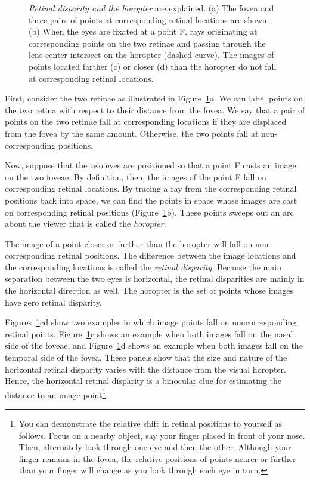 \begin{figure}
\centerline {
}
\caption[Retinal Disparity]{
{\em Retinal disparity and the horopter} are explained.
(a) The fovea and three pairs of points 
at corresponding retinal locations are shown.
(b) When the eyes are fixated at a point F,
rays originating at corresponding points on the two retinae
and passing through the lens center
intersect on the horopter (dashed curve).
The images of points located farther (c) or
closer (d) than the horopter do not fall at corresponding
retinal locations.
}
\label{f5:disparities}
\end{figure}
First, consider the two retinae as illustrated in
Figure~\ref{f5:disparities}a.
We can label points on the two retina with respect to their
distance from the fovea.
We say that a pair of points on the two retinae fall at
corresponding locations if they are displaced from the
fovea by the same amount.
Otherwise, the two points fall at non-corresponding positions.

Now, suppose that the two eyes are positioned so that
a point F casts an image on the two foveae.
By definition, then, the images of the  point F fall
on corresponding retinal locations.
By tracing a ray from the corresponding retinal positions
back into space,
we can find the points in space whose images 
are cast on corresponding
retinal positions (Figure~\ref{f5:disparities}b).
These points sweeps out an
arc about the viewer that is called the {\em horopter}.

The image of a point closer or further
than the horopter will fall
on non-corresponding retinal positions.
The difference between the image locations and
the corresponding locations is called the
{\em retinal disparity}.
Because the main separation
between the two eyes is horizontal, the
retinal disparities are mainly in the horizontal direction as well.
The horopter is the set of points whose images have zero retinal disparity.

Figures~\ref{f5:disparities}cd show
two examples in which image points
fall on noncorresponding retinal points.
Figure~\ref{f5:disparities}c shows an example
when both images fall on the nasal side of the foveae,
and Figure~\ref{f5:disparities}d shows an example
when both images fall on the temporal side of the fovea.
These panels show that the size and nature of the horizontal
retinal disparity varies with the distance
from the visual horopter.
Hence, the horizontal retinal disparity is a
binocular clue
for estimating the distance to an image point\footnote{
You can demonstrate the relative shift in retinal positions
to yourself as follows.
Focus on a nearby object, say your finger placed in front of your nose.
Then, alternately look through one eye and then the other.
Although your finger remains in the fovea, the relative
positions of points nearer or further than your finger
will change as you look through each eye in turn.}.

